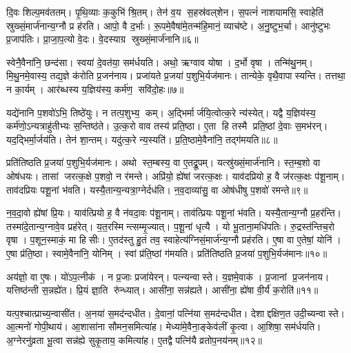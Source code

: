 दि॒वः शिल्प॒मव॑ततम्।
पृ॒थि॒व्याः क॒कुभि॑ श्रि॒तम्।
तेन॑ व॒य स॒हस्र॑वल्‌शेन।
स॒पत्नं॑ नाशयामसि॒ स्वाहेति॑ स्रुख्सं॒मार्ज॑नान्य॒ग्नौ प्र ह॑रति।
आपो॒ वै द॒र्भाः।
रू॒पमे॒वैषा॑मे॒तन्म॑हि॒मानं॒ व्याच॑ष्टे।
अ॒नु॒ष्टुभ॒र्चा।
आनु॑ष्टुभः प्र॒जाप॑तिः।
प्रा॒जा॒प॒त्यो वे॒दः।
वे॒दस्याग्र स्रुख्सं॒मार्ज॑नानि॥६॥

स्वेनै॒वैना॑नि॒ छन्द॑सा।
स्वया॑ दे॒वत॑या॒ सम॑र्धयति।
अथो॒ ऋग्वाव योषा।
द॒र्भो वृषा।
तन्मि॑थु॒नम्।
मि॒थु॒नमे॒वास्य॒ तद्य॒ज्ञे क॑रोति प्र॒जन॑नाय।
प्रजा॑यते प्र॒जया॑ प॒शुभि॒र्यज॑मानः।
तान्येके॒ वृथै॒वापास्यन्ति।
तत्तथा॒ न का॒र्यम्।
आर॑ब्धस्य य॒ज्ञिय॑स्य॒ कर्म॑ण॒ सवि॑दो॒हः॥७॥

यद्ये॑नानि प॒शवो॑ऽभि॒ तिष्ठे॑युः।
न तत्प॒शुभ्य॒ कम्।
अ॒द्भिर्मार्जयि॒त्वोत्क॒रे न्य॑स्येत्।
यद्वै य॒ज्ञिय॑स्य॒ कर्म॑णो॒ऽन्यत्राहु॑तीभ्यः स॒न्तिष्ठ॑ते।
उ॒त्क॒रो वाव तस्य॑ प्रति॒ष्ठा।
ए॒ता हि तस्मै प्रति॒ष्ठां दे॒वाः स॒मभ॑रन्।
यद॒द्भिर्मा॒र्जय॑ति।
तेन॑ शा॒न्तम्।
यदु॑त्क॒रे न्य॒स्यति॑।
प्र॒ति॒ष्ठामे॒वैना॑नि॒ तद्ग॑मयति॥८॥

प्रति॑तिष्ठति प्र॒जया॑ प॒शुभि॒र्यज॑मानः।
अथो स्त॒म्बस्य॒ वा ए॒तद्रू॒पम्।
यत्स्रु॑ख्सं॒मार्ज॑नानि।
स्त॒म्ब॒शो वा ओष॑धयः।
तासां जरत्क॒क्षे प॒शवो॒ न र॑मन्ते।
अप्रि॑यो॒ ह्ये॑षां जरत्क॒क्षः।
याव॑दप्रियो ह॒ वै ज॑रत्क॒क्षः प॑शू॒नाम्।
ताव॑दप्रियः पशू॒नां भ॑वति।
यस्यै॒तान्य॒न्यत्रा॒ग्नेर्दध॑ति।
न॒व॒दाव्या॑सु॒ वा ओष॑धीषु प॒शवो॑ रमन्ते॥९॥

न॒व॒दा॒वो ह्ये॑षां प्रि॒यः।
याव॑त्प्रियो ह॒ वै न॑वदा॒वः प॑शू॒नाम्।
ताव॑त्प्रियः पशू॒नां भ॑वति।
यस्यै॒तान्य॒ग्नौ प्र॒हर॑न्ति।
तस्मा॑दे॒तान्य॒ग्नावे॒व प्रह॑रेत्।
य॒त॒रस्मिन्त्सम्मृ॒ज्यात्।
प॒शू॒नां धृत्यै।
यो भू॒ताना॒मधि॑पतिः।
रु॒द्रस्त॑न्तिच॒रो वृषा।
प॒शून॒स्माकं॒ मा हिसीः।
ए॒तद॑स्तु हु॒तं तव॒ स्वाहेत्य॑ग्निसं॒मार्ज॑न्य॒ग्नौ प्रह॑रति।
ए॒षा वा ए॒तेषां॒ योनि॑।
ए॒षा प्र॑ति॒ष्ठा।
स्वामे॒वैना॑नि॒ योनिम्।
स्वां प्र॑ति॒ष्ठां ग॑मयति।
प्रति॑तिष्ठति प्र॒जया॑ प॒शुभि॒र्यज॑मानः॥१०॥

अय॑ज्ञो॒ वा ए॒षः।
यो॑ऽप॒त्नीक॑।
न प्र॒जाः प्रजा॑येरन्।
पत्न्यन्वास्ते।
य॒ज्ञमे॒वाक॑।
प्र॒जानां प्र॒जन॑नाय।
यत्तिष्ठ॑न्ती स॒न्नह्ये॑त।
प्रि॒यं ज्ञा॒ति रु॑न्ध्यात्।
आसी॑ना॒ सन्न॑ह्यते।
आसी॑ना॒ ह्ये॑षा वी॒र्य॑॑ क॒रोति॑॥११॥

यत्प॒श्चात्प्राच्य॒न्वासी॑त।
अ॒नया॑ स॒मद॑न्दधीत।
दे॒वानां॒ पत्नि॑या स॒मद॑न्दधीत।
देशाद्दक्षिण॒त उदी॒च्यन्वास्ते।
आ॒त्मनो॑ गोपी॒थाय॑।
आ॒शासा॑ना सौमन॒समित्या॑ह।
मेध्या॑मे॒वैना॒ङ्केव॑लीं कृ॒त्वा।
आ॒शिषा॒ सम॑र्धयति।
अ॒ग्नेरनु॑व्रता भू॒त्वा सन्न॑ह्ये सुकृ॒ताय॒ कमित्या॑ह।
ए॒तद्वै पत्नि॑यै व्रतोप॒नय॑नम्॥१२॥

